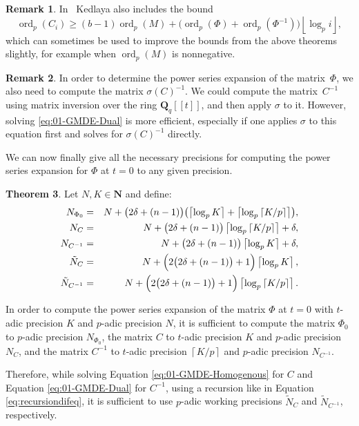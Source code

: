 \documentclass[a4paper,11pt]{article}
\numberwithin{equation}{section}
\providecommand{\floor}[1]{\left\lfloor#1\right\rfloor}   %
\providecommand{\ceil}[1]{\left\lceil#1\right\rceil}   %
\newcommand{\NN}{\mathbf{N}} %
\newcommand{\QQ}{\mathbf{Q}} %
\DeclareMathOperator{\ord}{ord}          %
\theoremstyle{definition}
\newtheorem{thm}{Theorem}[section]
\newtheorem{rem}[thm]{Remark}
\begin{document}
\begin{rem}
In~\citep[Remark~18.3.4]{Kedlaya2010} Kedlaya also includes the bound
\begin{equation*}
\ord_p(C_i) \geq (b - 1) \ord_p(M) 
            + \bigl( \ord_p(\Phi) + \ord_p(\Phi^{-1}) \bigr) \floor{\log_p i},
\end{equation*}
which can sometimes be used to improve the bounds from the above theorems slightly, 
for example when $\ord_p(M)$ is nonnegative.
\end{rem}

\begin{rem} \label{rem:sigmatrick}
In order to determine the power series expansion of the matrix~$\Phi$, 
we also need to compute the matrix $\sigma(C)^{-1}$. We could compute 
the matrix~$C^{-1}$ using matrix inversion over the ring $\mathbf{Q}_q[[t]]$,
and then apply $\sigma$ to it. However, solving \eqref{eq:01-GMDE-Dual} is 
more efficient, especially if one applies $\sigma$ to this equation first 
and solves for $\sigma(C)^{-1}$ directly.
\end{rem}

We can now finally give all the necessary precisions for computing the power 
series expansion for $\Phi$ at $t=0$ to any given precision.

\begin{thm} \label{thm:Ni}
Let $N,K \in \NN$ and define:
\begin{eqnarray*}
N_{\Phi_0}   		&=& N+\bigl(2\delta+(n-1)\bigr) \bigl(\ceil{\log_p K} + \ceil{\log_p \ceil{K/p}}\bigr),\\
N_{C}				&=& N+\bigl(2\delta+(n-1)\bigr) \ceil{\log_p \ceil{K/p}} + \delta, \\
N_{C^{-1}}			&=& N+\bigl(2\delta+(n-1)\bigr) \ceil{\log_p K} + \delta, \\
\tilde{N}_C			&=& N+\Bigl(2 \bigl(2 \delta + (n-1)\bigr) + 1\Bigr) \ceil{\log_p K}, \\
\tilde{N}_{C^{-1}}	&=& N+\Bigl(2 \bigl(2 \delta + (n-1)\bigr) + 1\Bigr) \ceil{\log_p \ceil{K/p}}.
\end{eqnarray*}

In order to compute the power series expansion 
of the matrix $\Phi$ at $t=0$ with $t$-adic precision $K$ and $p$-adic precision $N$, 
it is sufficient to compute
the matrix $\Phi_0$ to $p$-adic precision $N_{\Phi_0}$,
the matrix $C$ to $t$-adic precision $K$ and $p$-adic precision $N_{C}$, and
the matrix $C^{-1}$ to $t$-adic precision $\ceil{K/p}$ and $p$-adic precision 
$N_{C^{-1}}$.

Therefore, while solving Equation \eqref{eq:01-GMDE-Homogenous} for $C$ and Equation \eqref{eq:01-GMDE-Dual} for $C^{-1}$, 
using a recursion like in Equation \eqref{eq:recursiondifeq}, it is sufficient to use $p$-adic 
working precisions $\tilde{N}_C$ and $\tilde{N}_{C^{-1}}$, respectively.
\end{thm}
\end{document}
